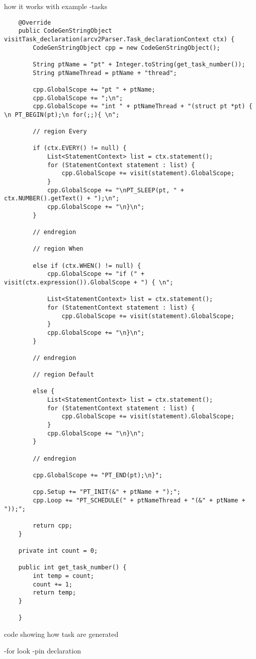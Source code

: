 how it works with example
    -tasks
    \begin{listing}[htb!]
        \begin{verbatim}
    @Override
    public CodeGenStringObject visitTask_declaration(arcv2Parser.Task_declarationContext ctx) {
        CodeGenStringObject cpp = new CodeGenStringObject();

        String ptName = "pt" + Integer.toString(get_task_number());
        String ptNameThread = ptName + "thread";

        cpp.GlobalScope += "pt " + ptName;
        cpp.GlobalScope += ";\n";
        cpp.GlobalScope += "int " + ptNameThread + "(struct pt *pt) { \n PT_BEGIN(pt);\n for(;;){ \n";

        // region Every

        if (ctx.EVERY() != null) {
            List<StatementContext> list = ctx.statement();
            for (StatementContext statement : list) {
                cpp.GlobalScope += visit(statement).GlobalScope;
            }
            cpp.GlobalScope += "\nPT_SLEEP(pt, " + ctx.NUMBER().getText() + ");\n";
            cpp.GlobalScope += "\n}\n";
        }

        // endregion

        // region When

        else if (ctx.WHEN() != null) {
            cpp.GlobalScope += "if (" + visit(ctx.expression()).GlobalScope + ") { \n";

            List<StatementContext> list = ctx.statement();
            for (StatementContext statement : list) {
                cpp.GlobalScope += visit(statement).GlobalScope;
            }
            cpp.GlobalScope += "\n}\n";
        }

        // endregion

        // region Default

        else {
            List<StatementContext> list = ctx.statement();
            for (StatementContext statement : list) {
                cpp.GlobalScope += visit(statement).GlobalScope;
            }
            cpp.GlobalScope += "\n}\n";
        }

        // endregion

        cpp.GlobalScope += "PT_END(pt);\n}";

        cpp.Setup += "PT_INIT(&" + ptName + ");";
        cpp.Loop += "PT_SCHEDULE(" + ptNameThread + "(&" + ptName + "));";

        return cpp;
    }

    private int count = 0;

    public int get_task_number() {
        int temp = count;
        count += 1;
        return temp;
    }

    }
        \end{verbatim}
        \caption{code showing how task are generated}
        \label{lst:code gen task}
    \end{listing}



    -for look
    -pin declaration